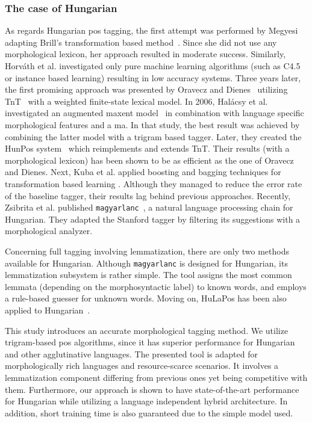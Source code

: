 \subsubsection{The case of Hungarian}

As regards Hungarian \gls{pos} tagging, the first attempt was performed by Megyesi~\cite{Megyesi1998} adapting Brill’s transformation based method~\cite{Brill1992}.
Since she did not use any morphological lexicon, her approach resulted in moderate success.
Similarly, Horváth et al. investigated \cite{Horvath1999} only pure machine learning algorithms (such as C4.5 or instance based learning) resulting in low accuracy systems.
Three years later, the first promising approach was presented by Oravecz and Dienes~\cite{Oravecz2002a} utilizing TnT~\cite{Brants2000} with a weighted finite-state lexical model.
In 2006, Halácsy et al. investigated an augmented \acrshort{maxent} model~\cite{Halacsy2006} in combination with language specific morphological features and a \acrshort{ma}.
In that study, the best result was achieved by combining the latter model with a trigram based tagger.
Later, they created the HunPos system~\cite{Halacsy2007} which reimplements and extends TnT.
Their results (with a morphological lexicon) has been shown to be as efficient as the one of Oravecz and Dienes.
Next, Kuba et al. applied boosting and bagging techniques for transformation based learning \cite{Kuba2004}.
Although they managed to reduce the error rate of the baseline tagger, their results lag behind previous approaches.
Recently, Zsibrita et al. published \texttt{magyarlanc}~\cite{zsibrata2013magyarlanc}, a natural language processing chain for Hungarian.
They adapted the Stanford tagger by filtering its suggestions with a morphological analyzer. 

Concerning full tagging involving lemmatization, there are only two methods available for Hungarian.
Although \texttt{magyarlanc} is designed for Hungarian, its lemmatization subsystem is rather simple.
The tool assigns the most common lemmata (depending on the morphosyntactic label) to known words, and employs a rule-based guesser for unknown words.
Moving on, HuLaPos has been also applied to Hungarian~\cite{Laki2013}. %

This study introduces an accurate morphological tagging method.
We utilize trigram-based \gls{pos} algorithms, since it has superior performance for Hungarian and other agglutinative languages.
The presented tool is adapted for morphologically rich languages and resource-scarce scenarios.
It involves a lemmatization component differing from previous ones yet being competitive with them.
Furthermore, our approach is shown to have state-of-the-art performance for Hungarian while utilizing a language independent hybrid architecture.
In addition, short training time is also guaranteed due to the simple model used.



